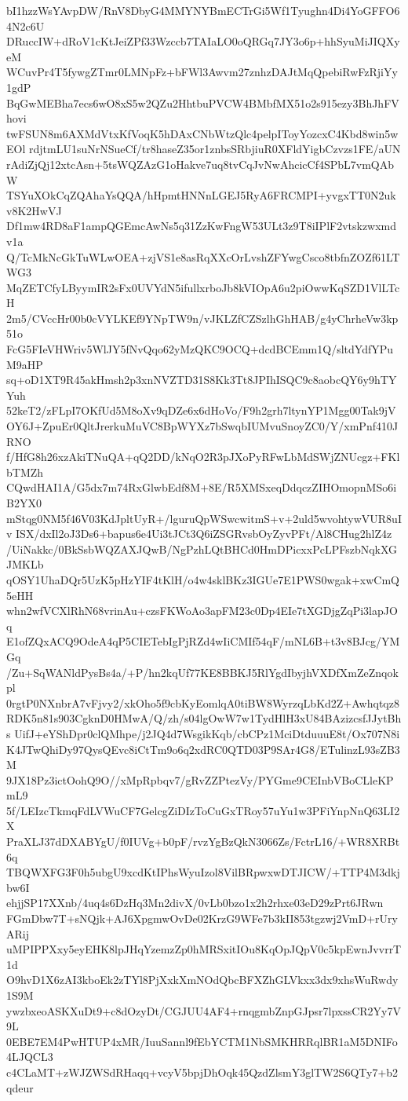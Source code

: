 bI1hzzWsYAvpDW/RnV8DbyG4MMYNYBmECTrGi5Wf1Tyughn4Di4YoGFFO64N2c6U
DRuccIW+dRoV1cKtJeiZPf33Wzccb7TAIaLO0oQRGq7JY3o6p+hhSyuMiJIQXyeM
WCuvPr4T5fywgZTmr0LMNpFz+bFWl3Awvm27znhzDAJtMqQpebiRwFzRjiYy1gdP
BqGwMEBha7ecs6wO8xS5w2QZu2HhtbuPVCW4BMbfMX51o2s915ezy3BhJhFVhovi
twFSUN8m6AXMdVtxKfVoqK5hDAxCNbWtzQlc4pelpIToyYozcxC4Kbd8win5wEOl
rdjtmLU1suNrNSueCf/tr8haseZ35or1znbsSRbjiuR0XFldYigbCzvzs1FE/aUN
rAdiZjQj12xtcAsn+5tsWQZAzG1oHakve7uq8tvCqJvNwAhcicCf4SPbL7vmQAbW
TSYuXOkCqZQAhaYsQQA/hHpmtHNNnLGEJ5RyA6FRCMPI+yvgxTT0N2ukv8K2HwVJ
Df1mw4RD8aF1ampQGEmcAwNs5q31ZzKwFngW53ULt3z9T8iIPlF2vtskzwxmdv1a
Q/TcMkNcGkTuWLwOEA+zjVS1e8asRqXXcOrLvshZFYwgCsco8tbfnZOZf61LTWG3
MqZETCfyLByymIR2sFx0UVYdN5ifullxrboJb8kVIOpA6u2piOwwKqSZD1VlLTcH
2m5/CVccHr00b0cVYLKEf9YNpTW9n/vJKLZfCZSzlhGhHAB/g4yChrheVw3kp51o
FcG5FIeVHWriv5WlJY5fNvQqo62yMzQKC9OCQ+dcdBCEmm1Q/sltdYdfYPuM9aHP
sq+oD1XT9R45akHmsh2p3xnNVZTD31S8Kk3Tt8JPIhISQC9c8aobcQY6y9hTYYuh
52keT2/zFLpI7OKfUd5M8oXv9qDZe6x6dHoVo/F9h2grh7ltynYP1Mgg00Tak9jV
OY6J+ZpuEr0QltJrerkuMuVC8BpWYXz7bSwqbIUMvuSnoyZC0/Y/xmPnf410JRNO
f/HfG8h26xzAkiTNuQA+qQ2DD/kNqO2R3pJXoPyRFwLbMdSWjZNUcgz+FKlbTMZh
CQwdHAI1A/G5dx7m74RxGlwbEdf8M+8E/R5XMSxeqDdqczZIHOmopnMSo6iB2YX0
mStqg0NM5f46V03KdJpltUyR+/lguruQpWSwcwitmS+v+2uld5wvohtywVUR8uIv
ISX/dxIl2oJ3Ds6+bapus6e4Ui3tJCt3Q6iZSGRvsbOyZyvPFt/Al8CHug2hlZ4z
/UiNakkc/0BkSsbWQZAXJQwB/NgPzhLQtBHCd0HmDPicxxPcLPFszbNqkXGJMKLb
qOSY1UhaDQr5UzK5pHzYIF4tKlH/o4w4sklBKz3IGUe7E1PWS0wgak+xwCmQ5eHH
whn2wfVCXlRhN68vrinAu+czsFKWoAo3apFM23c0Dp4EIe7tXGDjgZqPi3lapJOq
E1ofZQxACQ9OdeA4qP5CIETebIgPjRZd4wIiCMIf54qF/mNL6B+t3v8BJcg/YMGq
/Zu+SqWANldPysBs4a/+P/hn2kqUf77KE8BBKJ5RlYgdIbyjhVXDfXmZeZnqokpl
0rgtP0NXnbrA7vFjvy2/xkOho5f9cbKyEomlqA0tiBW8WyrzqLbKd2Z+Awhqtqz8
RDK5n81s903CgknD0HMwA/Q/zh/s04lgOwW7w1TydHlH3xU84BAzizcsfJJytBhs
UifJ+eYShDpr0clQMhpe/j2JQ4d7WsgikKqb/cbCPz1MciDtduuuE8t/Ox707N8i
K4JTwQhiDy97QysQEvc8iCtTm9o6q2xdRC0QTD03P9SAr4G8/ETulinzL93sZB3M
9JX18Pz3ictOohQ9O//xMpRpbqv7/gRvZZPtezVy/PYGme9CEInbVBoCLleKPmL9
5f/LEIzcTkmqFdLVWuCF7GelcgZiDIzToCuGxTRoy57uYu1w3PFiYnpNnQ63LI2X
PraXLJ37dDXABYgU/f0IUVg+b0pF/rvzYgBzQkN3066Zs/FctrL16/+WR8XRBt6q
TBQWXFG3F0h5ubgU9xcdKtIPhsWyuIzol8VilBRpwxwDTJICW/+TTP4M3dkjbw6I
ehjjSP17XXnb/4uq4s6DzHq3Mn2divX/0vLb0bzo1x2h2rhxe03eD29zPrt6JRwn
FGmDbw7T+sNQjk+AJ6XpgmwOvDe02KrzG9WFe7b3kII853tgzwj2VmD+rUryARij
uMPIPPXxy5eyEHK8lpJHqYzemzZp0hMRSxitIOu8KqOpJQpV0c5kpEwnJvvrrT1d
O9hvD1X6zAI3kboEk2zTYl8PjXxkXmNOdQbcBFXZhGLVkxx3dx9xhsWuRwdy1S9M
ywzbxeoASKXuDt9+c8dOzyDt/CGJUU4AF4+rnqgmbZnpGJpsr7lpxssCR2Yy7V9L
0EBE7EM4PwHTUP4xMR/IuuSannl9fEbYCTM1NbSMKHRRqlBR1aM5DNIFo4LJQCL3
c4CLaMT+zWJZWSdRHaqq+vcyV5bpjDhOqk45QzdZlsmY3glTW2S6QTy7+b2qdeur
